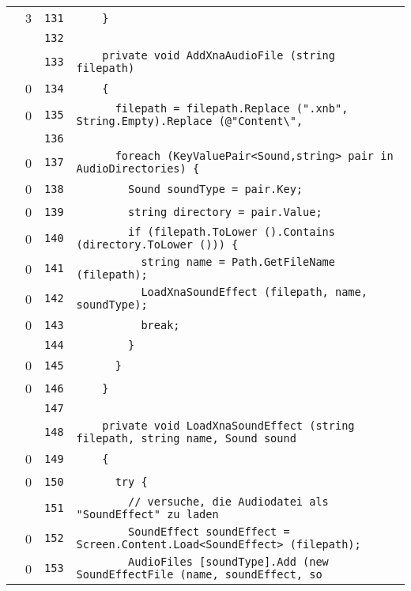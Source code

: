 \documentclass[a4paper,10pt]{article}
\begin{document}
\begin{longtable}[l]{lrrl}
\cellcolor{green} & 3 & \verb~131~ & \verb~    }~\\
\cellcolor{gray} &  & \verb~132~ & \verb~~\\
\cellcolor{gray} &  & \verb~133~ & \verb~    private void AddXnaAudioFile (string filepath)~\\
\cellcolor{red} & 0 & \verb~134~ & \verb~    {~\\
\cellcolor{red} & 0 & \verb~135~ & \verb~      filepath = filepath.Replace (".xnb", String.Empty).Replace (@"Content\",~\\
\cellcolor{gray} &  & \verb~136~ & \verb~~\\
\cellcolor{red} & 0 & \verb~137~ & \verb~      foreach (KeyValuePair<Sound,string> pair in AudioDirectories) {~\\
\cellcolor{red} & 0 & \verb~138~ & \verb~        Sound soundType = pair.Key;~\\
\cellcolor{red} & 0 & \verb~139~ & \verb~        string directory = pair.Value;~\\
\cellcolor{red} & 0 & \verb~140~ & \verb~        if (filepath.ToLower ().Contains (directory.ToLower ())) {~\\
\cellcolor{red} & 0 & \verb~141~ & \verb~          string name = Path.GetFileName (filepath);~\\
\cellcolor{red} & 0 & \verb~142~ & \verb~          LoadXnaSoundEffect (filepath, name, soundType);~\\
\cellcolor{red} & 0 & \verb~143~ & \verb~          break;~\\
\cellcolor{gray} &  & \verb~144~ & \verb~        }~\\
\cellcolor{red} & 0 & \verb~145~ & \verb~      }~\\
\cellcolor{red} & 0 & \verb~146~ & \verb~    }~\\
\cellcolor{gray} &  & \verb~147~ & \verb~~\\
\cellcolor{gray} &  & \verb~148~ & \verb~    private void LoadXnaSoundEffect (string filepath, string name, Sound sound~\\
\cellcolor{red} & 0 & \verb~149~ & \verb~    {~\\
\cellcolor{red} & 0 & \verb~150~ & \verb~      try {~\\
\cellcolor{gray} &  & \verb~151~ & \verb~        // versuche, die Audiodatei als "SoundEffect" zu laden~\\
\cellcolor{red} & 0 & \verb~152~ & \verb~        SoundEffect soundEffect = Screen.Content.Load<SoundEffect> (filepath);~\\
\cellcolor{red} & 0 & \verb~153~ & \verb~        AudioFiles [soundType].Add (new SoundEffectFile (name, soundEffect, so~\\

\end{longtable}
\end{document}
